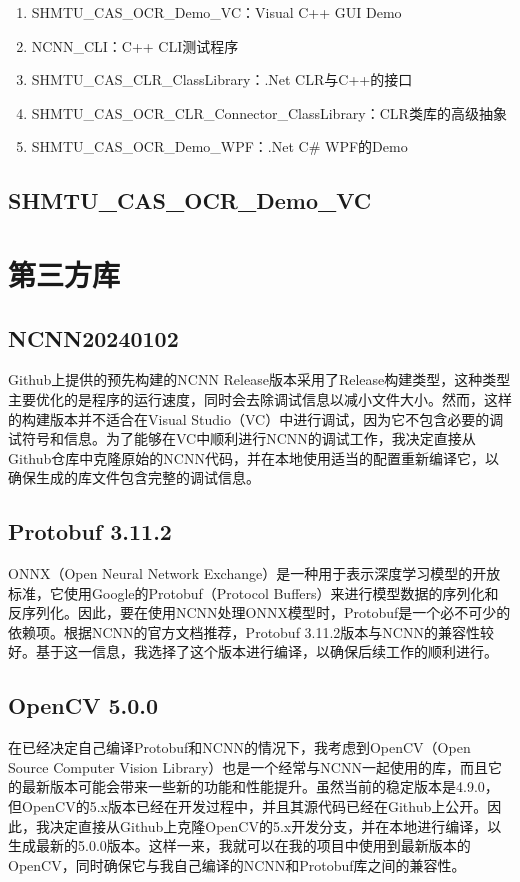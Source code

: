\begin{enumerate}
	\item SHMTU\_CAS\_OCR\_Demo\_VC：Visual C++ GUI Demo
	\item NCNN\_CLI：C++ CLI测试程序
	\item SHMTU\_CAS\_CLR\_ClassLibrary：.Net CLR与C++的接口
	\item SHMTU\_CAS\_OCR\_CLR\_Connector\_ClassLibrary：CLR类库的高级抽象
	\item SHMTU\_CAS\_OCR\_Demo\_WPF：.Net C\# WPF的Demo
\end{enumerate}

\subsection{SHMTU\_CAS\_OCR\_Demo\_VC}

\section{第三方库}

\subsection{NCNN20240102}

Github上提供的预先构建的NCNN Release版本采用了Release构建类型，这种类型主要优化的是程序的运行速度，同时会去除调试信息以减小文件大小。然而，这样的构建版本并不适合在Visual Studio（VC）中进行调试，因为它不包含必要的调试符号和信息。为了能够在VC中顺利进行NCNN的调试工作，我决定直接从Github仓库中克隆原始的NCNN代码，并在本地使用适当的配置重新编译它，以确保生成的库文件包含完整的调试信息。

\subsection{Protobuf 3.11.2}

ONNX（Open Neural Network Exchange）是一种用于表示深度学习模型的开放标准，它使用Google的Protobuf（Protocol Buffers）来进行模型数据的序列化和反序列化。因此，要在使用NCNN处理ONNX模型时，Protobuf是一个必不可少的依赖项。根据NCNN的官方文档推荐，Protobuf 3.11.2版本与NCNN的兼容性较好。基于这一信息，我选择了这个版本进行编译，以确保后续工作的顺利进行。

\subsection{OpenCV 5.0.0}

在已经决定自己编译Protobuf和NCNN的情况下，我考虑到OpenCV（Open Source Computer Vision Library）也是一个经常与NCNN一起使用的库，而且它的最新版本可能会带来一些新的功能和性能提升。虽然当前的稳定版本是4.9.0，但OpenCV的5.x版本已经在开发过程中，并且其源代码已经在Github上公开。因此，我决定直接从Github上克隆OpenCV的5.x开发分支，并在本地进行编译，以生成最新的5.0.0版本。这样一来，我就可以在我的项目中使用到最新版本的OpenCV，同时确保它与我自己编译的NCNN和Protobuf库之间的兼容性。

